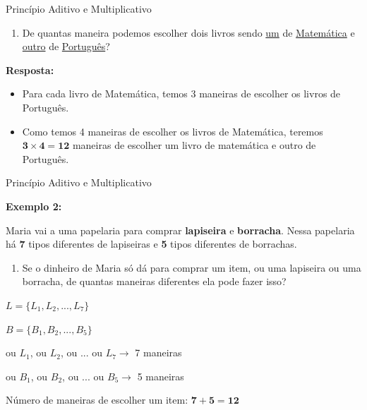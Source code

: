\documentclass[aspectratio=169]{beamer}
\begin{document}
\begin{frame}{Princípio Aditivo e Multiplicativo}
    \begin{enumerate}[a]
        \item De quantas maneira podemos escolher dois livros sendo \underline{um} de \underline{Matemática} e \underline{outro} de \underline{Português}?
    \end{enumerate}
    
    \vspace{3mm}

    \textbf{Resposta:}

    \vspace{3mm}

    \begin{itemize}
        \item Para cada livro de Matemática, temos 3 maneiras de escolher os livros de Português.
        \item Como temos 4 maneiras de escolher os livros de Matemática, teremos $ \boldsymbol{3 \times 4 = 12}$ maneiras de escolher um livro de matemática e outro de Português.
    \end{itemize}
\end{frame}


\begin{frame}{Princípio Aditivo e Multiplicativo}

    \textbf{Exemplo  2:}

    \vspace{4mm}
    Maria vai a uma papelaria para comprar \textbf{lapiseira} e \textbf{borracha}. Nessa papelaria há \textbf{7} tipos diferentes de lapiseiras e \textbf{5} tipos diferentes de borrachas.

    \vspace{3mm}

    \begin{enumerate}[a]
        \item Se o dinheiro de Maria só dá para comprar um item, ou uma lapiseira ou uma borracha, de quantas maneiras diferentes ela pode fazer isso?
    \end{enumerate}

    \begin{center}
        \begin{multicols}{2}
            $L = \{L_1, L_2, ..., L_7\}$
    
            \columnbreak
    
            $B = \{B_1, B_2, ..., B_5\} $
    
        \end{multicols}
    \end{center}

\begin{center}
    ou $L_1$, ou $L_2$, ou ... ou $L_7 \rightarrow $  7 maneiras
    
    ou $B_1$, ou $B_2$, ou ... ou $B_5 \rightarrow $  5 maneiras
    
\end{center}

Número de maneiras de escolher um item: $\boldsymbol{7 + 5 = 12}$
\end{frame}
\end{document}
